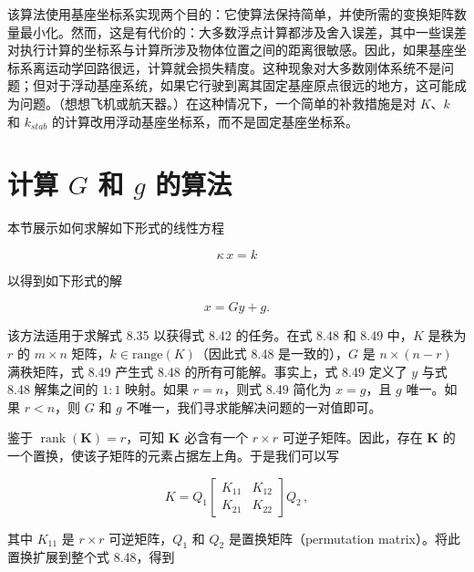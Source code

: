 \documentclass[10pt,a4paper]{book}
\theoremstyle{thmstyle} %
\theoremstyle{defstyle} %
\theoremstyle{prostyle} %
\begin{document}
该算法使用基座坐标系实现两个目的：它使算法保持简单，并使所需的变换矩阵数量最小化。然而，这是有代价的：大多数浮点计算都涉及舍入误差，其中一些误差对执行计算的坐标系与计算所涉及物体位置之间的距离很敏感。因此，如果基座坐标系离运动学回路很远，计算就会损失精度。这种现象对大多数刚体系统不是问题；但对于浮动基座系统，如果它行驶到离其固定基座原点很远的地方，这可能成为问题。（想想飞机或航天器。）在这种情况下，一个简单的补救措施是对 $K$、$k$ 和 $k_{stab}$ 的计算改用浮动基座坐标系，而不是固定基座坐标系。



\section{计算 $G$ 和 $g$ 的算法}





本节展示如何求解如下形式的线性方程



$$
\kappa \, x = k
$$



以得到如下形式的解



$$
x = G y + g .
$$



该方法适用于求解式 8.35 以获得式 8.42 的任务。在式 8.48 和 8.49 中，$K$ 是秩为 $r$ 的 $m \times n$ 矩阵，$k \in \text{range}(K)$（因此式 8.48 是一致的），$G$ 是 $n \times (n - r)$ 满秩矩阵，式 8.49 产生式 8.48 的所有可能解。事实上，式 8.49 定义了 $y$ 与式 8.48 解集之间的 $1:1$ 映射。如果 $r = n$，则式 8.49 简化为 $x = g$，且 $g$ 唯一。如果 $r < n$，则 $G$ 和 $g$ 不唯一，我们寻求能解决问题的一对值即可。



鉴于 $\operatorname{rank}(\boldsymbol{K})=r$，可知 $\boldsymbol{K}$ 必含有一个 $r \times r$ 可逆子矩阵。因此，存在 $\boldsymbol{K}$ 的一个置换，使该子矩阵的元素占据左上角。于是我们可以写



$$
K = Q _ { 1 } \left[ \begin{array}{ll} { { K _ { 11 } } } & { { K _ { 12 } } } \\{ { K _ { 21 } } } & { { K _ { 22 } } } \end{array} \right] Q _ { 2 } \, ,
$$



其中 $K_{11}$ 是 $r \times r$ 可逆矩阵，$Q_{1}$ 和 $Q_{2}$ 是置换矩阵（permutation matrix）。将此置换扩展到整个式 8.48，得到
\end{document}
